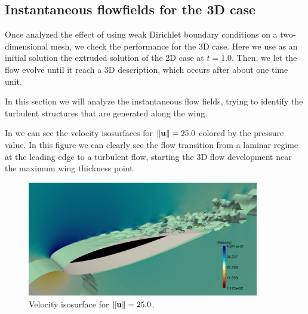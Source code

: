 \subsection{Instantaneous flowfields for the 3D case}
Once analyzed the effect of using weak Dirichlet boundary conditions on a two-dimensional mesh, we check the performance for the 3D case. Here we use as an initial solution the extruded solution of the 2D case at $ t=1.0 $. Then, we let the flow evolve until it reach a 3D description, which occurs after about one time unit.

In this section we will analyze the instantaneous flow fields, trying to identify the turbulent structures that are generated along the wing.

In  we can see the velocity isosurfaces for $ \|{\bf u}\|=25.0 $ colored by the pressure value. In this figure we can clearly see the flow transition from a laminar regime at the leading edge to a turbulent flow, starting the 3D flow development near the maximum wing thickness point.
\begin{figure}[h!]
  \centering
  \includegraphics[width=0.9\textwidth]{Figures/Chapter8/weak/velo_3d}
  \caption{Velocity isosurface for $ \|{\bf u}\|=25.0  $.}
  \label{fig-NACA_3D_velo}
\end{figure}

